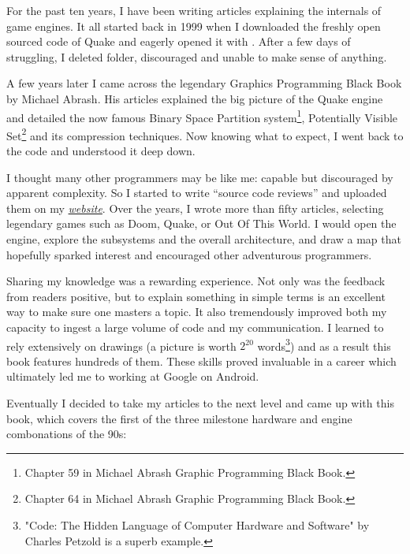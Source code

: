 \documentclass[book.tex]{subfiles}
\begin{document}
For the past ten years, I have been writing articles explaining the internals of game engines. It all started back in 1999 when I downloaded the freshly open sourced code of \mbox{Quake} and eagerly opened it with . After a few days of struggling, I deleted  folder, discouraged and unable to make sense of anything.

\bigskip

A few years later I came across the legendary Graphics Programming Black Book by Michael Abrash. His articles explained the big picture of the Quake engine and detailed the now famous Binary Space Partition system\footnote{Chapter 59 in Michael Abrash Graphic Programming Black Book.}, Potentially Visible Set\footnote{Chapter 64 in Michael Abrash Graphic Programming Black Book.} and its compression techniques. Now knowing what to expect, I went back to the code and understood it deep down.

\bigskip

I thought many other programmers may be like me: capable but discouraged by apparent complexity. So I started to write ``source  code reviews'' and uploaded them on my
\href{http://fabiensanglard.net}{\textit{website}}. Over the years, I wrote more than fifty articles, selecting legendary games such as Doom, Quake, or Out Of This World. I would open the engine, explore the subsystems and the overall architecture, and draw a map that hopefully sparked interest and encouraged other adventurous programmers.

\bigskip

Sharing my knowledge was a rewarding experience. Not only was the feedback from readers positive, but to explain something in simple terms is an excellent way to make sure one masters a topic. It also tremendously improved both my capacity to ingest a large volume of code and my communication. I learned to rely extensively on drawings (a picture is worth $2^{20}$ words\footnote{"Code: The Hidden Language of Computer Hardware and Software" by Charles Petzold is a superb example.}) and as a result this book features hundreds of them. These skills proved invaluable in a career which ultimately led me to working at Google on Android.

\newpage

Eventually I decided to take my articles to the next level and came up with this book, which covers the first of the three milestone hardware and engine combonations of the 90s:
\end{document}
